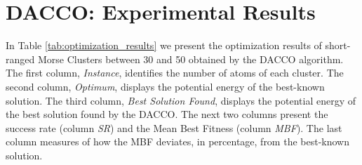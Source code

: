 \section{DACCO: Experimental Results}
\label{sec:experimental_results}
	
	In Table \ref{tab:optimization_results} we present the optimization results of short-ranged Morse Clusters between 30 and 50 obtained by the DACCO algorithm. The first column, \emph{Instance}, identifies the number of atoms of each cluster. The second column, \emph{Optimum}, displays the potential energy of the best-known solution. The third column, \emph{Best Solution Found}, displays the potential energy of the best solution found by the DACCO. The next two columns present the success rate (column \emph{SR}) and the Mean Best Fitness (column \emph{MBF}). The last column measures of how the MBF deviates, in percentage, from the best-known solution.
